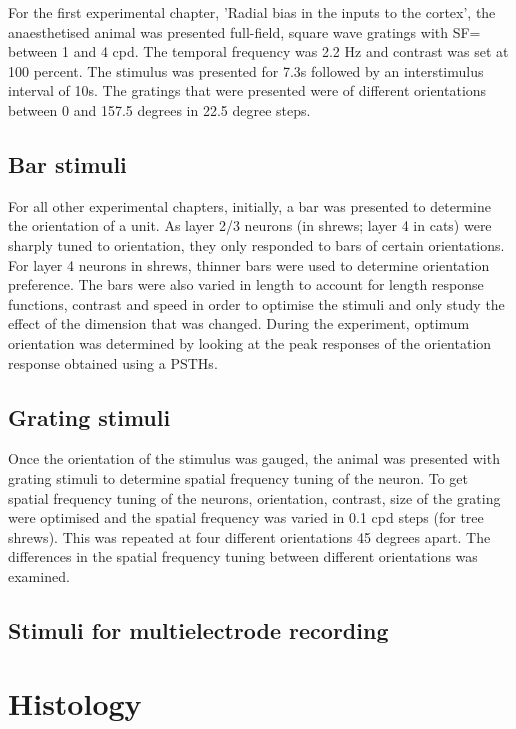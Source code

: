 For the first experimental chapter, 'Radial bias in the inputs to the cortex', the anaesthetised animal was presented full-field, square wave gratings with SF= between 1 and 4 cpd. The temporal frequency was 2.2 Hz and contrast was set at 100 percent. The stimulus was presented for 7.3s followed by an interstimulus interval of 10s. The gratings that were presented were of different orientations between 0 and 157.5 degrees in 22.5 degree steps. 
\subsection{Bar stimuli}

For all other experimental chapters, initially, a bar was presented to determine the orientation of a unit. As layer 2/3 neurons (in shrews; layer 4 in cats) were sharply tuned to orientation, they only responded to bars of certain orientations. For layer 4 neurons in shrews, thinner bars were used to determine orientation preference. The bars were also varied in length to account for length response functions, contrast and speed in order to optimise the stimuli and only study the effect of the dimension that was changed. During the experiment, optimum orientation was determined by looking at the peak responses of the orientation response obtained using a PSTHs.

\subsection{Grating stimuli}

Once the orientation of the stimulus was gauged, the animal was presented with grating stimuli to determine spatial frequency tuning of the neuron. To get spatial frequency tuning of the neurons, orientation, contrast, size of the grating were optimised and the spatial frequency was varied in 0.1 cpd steps (for tree shrews). This was repeated at four different orientations 45 degrees apart. The differences in the spatial frequency tuning between different orientations was examined.

\subsection{Stimuli for multielectrode recording}


\section{Histology}

